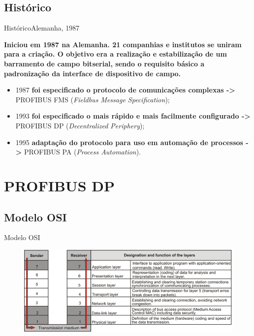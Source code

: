 \documentclass{beamer}
\begin{document}
\subsection{Histórico}

\begin{frame}{Histórico}{Alemanha, 1987}
	\begin{scriptsize}
	\textbf{Iniciou em 1987 na Alemanha. 21 companhias e institutos se uniram para a criação. O objetivo era a realização e estabilização de um barramento de campo bitserial, sendo o requisito básico a padronização da interface de dispositivo de campo.}
	

	\begin{itemize}
		\item 1987 \textbf{foi especificado o protocolo de comunicações complexas ->} PROFIBUS FMS (\textit{Fieldbus Message Specification}); 
		
		
		\item 1993 \textbf{foi especificado o mais rápido e mais facilmente 
configurado ->} PROFIBUS DP (\textit{Decentralized Periphery});
		
		\item 1995 \textbf{adaptação do protocolo para uso em automação de processos ->} PROFIBUS PA (\textit{Process Automation}).
		
	\end{itemize}
	
 	\end{scriptsize}
\end{frame}


\section{PROFIBUS DP}

\subsection{Modelo OSI}

\begin{frame}{Modelo OSI}

	\begin{figure}
	\centering
	\includegraphics[scale=0.4]{figs/osi}
	\end{figure}

\end{frame}
\end{document}
